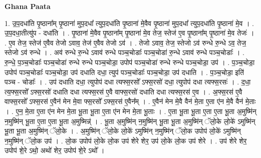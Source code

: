 \documentclass[17pt]{extarticle}
\begin{document}
\textbf{Ghana Paata } \newline

1. उ॒प॒दधा॑ति पृ॒ष्ठाना᳚म् पृ॒ष्ठाना॑ मुप॒दधा᳚ त्युप॒दधा॑ति पृ॒ष्ठाना॑ मे॒वैव पृ॒ष्ठाना॑ मुप॒दधा᳚ त्युप॒दधा॑ति पृ॒ष्ठाना॑ मे॒व । . उ॒प॒दधा॒तीत्यु॑प - दधा॑ति । . पृ॒ष्ठाना॑ मे॒वैव पृ॒ष्ठाना᳚म् पृ॒ष्ठाना॑ मे॒व तेज॒ स्तेज॑ ए॒व पृ॒ष्ठाना᳚म् पृ॒ष्ठाना॑ मे॒व तेजः॑ । . ए॒व तेज॒ स्तेज॑ ए॒वैव तेजो ऽवाव॒ तेज॑ ए॒वैव तेजो ऽव॑ । . तेजो ऽवाव॒ तेज॒ स्तेजो ऽव॑ रुन्धे रु॒न्धे ऽव॒ तेज॒ स्तेजो ऽव॑ रुन्धे । . अव॑ रुन्धे रु॒न्धे ऽवाव॑ रुन्धे पञ्च॒चोडाः᳚ पञ्च॒चोडा॑ रु॒न्धे ऽवाव॑ रुन्धे पञ्च॒चोडाः᳚ । . रु॒न्धे॒ प॒ञ्च॒चोडाः᳚ पञ्च॒चोडा॑ रुन्धे रुन्धे पञ्च॒चोडा॒ उपोप॑ पञ्च॒चोडा॑ रुन्धे रुन्धे पञ्च॒चोडा॒ उप॑ । . प॒ञ्च॒चोडा॒ उपोप॑ पञ्च॒चोडाः᳚ पञ्च॒चोडा॒ उप॑ दधाति दधा॒ त्युप॑ पञ्च॒चोडाः᳚ पञ्च॒चोडा॒ उप॑ दधाति । . प॒ञ्च॒चोडा॒ इति॑ पञ्च - चोडाः᳚ । . उप॑ दधाति दधा॒ त्युपोप॑ दधा त्यफ्स॒रसो᳚ ऽफ्स॒रसो॑ दधा॒ त्युपोप॑ दधा त्यफ्स॒रसः॑ । . द॒धा॒ त्य॒फ्स॒रसो᳚ ऽफ्स॒रसो॑ दधाति दधा त्यफ्स॒रस॑ ए॒वै वाफ्स॒रसो॑ दधाति दधा त्यफ्स॒रस॑ ए॒व । . अ॒फ्स॒रस॑ ए॒वै वाफ्स॒रसो᳚ ऽफ्स॒रस॑ ए॒वैन॑ मेन मे॒वा फ्स॒रसो᳚ ऽफ्स॒रस॑ ए॒वैन᳚म् । . ए॒वैन॑ मेन मे॒वै वैन॑ मे॒ता ए॒ता ए॑न मे॒वै वैन॑ मे॒ताः । . ए॒न॒ मे॒ता ए॒ता ए॑न मेन मे॒ता भू॒ता भू॒ता ए॒ता ए॑न मेन मे॒ता भू॒ताः । . ए॒ता भू॒ता भू॒ता ए॒ता ए॒ता भू॒ता अ॒मुष्मि॑न् न॒मुष्मि॑न् भू॒ता ए॒ता ए॒ता भू॒ता अ॒मुष्मिन्न्॑ । . भू॒ता अ॒मुष्मि॑न् न॒मुष्मि॑न् भू॒ता भू॒ता अ॒मुष्मि॑न् ॅलो॒के लो॒के॑ ऽमुष्मि॑न् भू॒ता भू॒ता अ॒मुष्मि॑न् ॅलो॒के । . अ॒मुष्मि॑न् ॅलो॒के लो॒के॑ ऽमुष्मि॑न् न॒मुष्मि॑न् ॅलो॒क उपोप॑ लो॒के॑ ऽमुष्मि॑न् न॒मुष्मि॑न् ॅलो॒क उप॑ । . लो॒क उपोप॑ लो॒के लो॒क उप॑ शेरे शेर॒ उप॑ लो॒के लो॒क उप॑ शेरे । . उप॑ शेरे शेर॒ उपोप॑ शे॒रे ऽथो॒ अथो॑ शेर॒ उपोप॑ शे॒रे ऽथो᳚ । \newline
\end{document}
